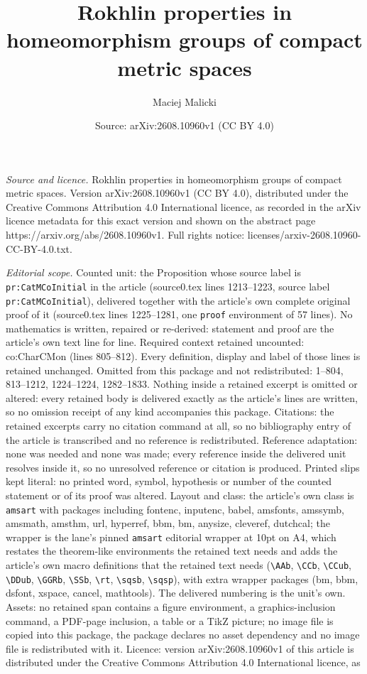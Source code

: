 \documentclass[10pt,a4paper]{amsart}
\title[Rokhlin properties in homeomorphism groups of compact metric]{Rokhlin properties in homeomorphism groups of compact metric spaces}
\author{Maciej Malicki}
\date{Source: arXiv:2608.10960v1 (CC BY 4.0)}
\begin{document}
\maketitle

\noindent\emph{Source and licence.} Rokhlin properties in homeomorphism groups of compact metric spaces. Version arXiv:2608.10960v1 (CC BY 4.0), distributed under the Creative Commons Attribution 4.0 International licence, as recorded in the arXiv licence metadata for this exact version and shown on the abstract page https://arxiv.org/abs/2608.10960v1. Full rights notice: licenses/arxiv-2608.10960-CC-BY-4.0.txt.\par\smallskip

\noindent\textit{Editorial scope.} Counted unit: the Proposition whose source label is \texttt{pr:CatMCoInitial} in the article (source0.tex lines 1213--1223, source label \texttt{pr:CatMCoInitial}), delivered together with the article's own complete original proof of it (source0.tex lines 1225--1281, one \texttt{proof} environment of 57 lines). No mathematics is written, repaired or re-derived: statement and proof are the article's own text line for line. Required context retained uncounted: co:CharCMon (lines 805--812). Every definition, display and label of those lines is retained unchanged. Omitted from this package and not redistributed: 1--804, 813--1212, 1224--1224, 1282--1833. Nothing inside a retained excerpt is omitted or altered: every retained body is delivered exactly as the article's lines are written, so no omission receipt of any kind accompanies this package. Citations: the retained excerpts carry no citation command at all, so no bibliography entry of the article is transcribed and no reference is redistributed. Reference adaptation: none was needed and none was made; every reference inside the delivered unit resolves inside it, so no unresolved reference or citation is produced. Printed slips kept literal: no printed word, symbol, hypothesis or number of the counted statement or of its proof was altered. Layout and class: the article's own class is \texttt{amsart} with packages including fontenc, inputenc, babel, amsfonts, amssymb, amsmath, amsthm, url, hyperref, bbm, bm, anysize, cleveref, dutchcal; the wrapper is the lane's pinned \texttt{amsart} editorial wrapper at 10pt on A4, which restates the theorem-like environments the retained text needs and adds the article's own macro definitions that the retained text needs (\texttt{\textbackslash AAb}, \texttt{\textbackslash CCb}, \texttt{\textbackslash CCub}, \texttt{\textbackslash DDub}, \texttt{\textbackslash GGRb}, \texttt{\textbackslash SSb}, \texttt{\textbackslash rt}, \texttt{\textbackslash sqsb}, \texttt{\textbackslash sqsp}), with extra wrapper packages (bm, bbm, dsfont, xspace, cancel, mathtools). The delivered numbering is the unit's own. Assets: no retained span contains a figure environment, a graphics-inclusion command, a PDF-page inclusion, a table or a TikZ picture; no image file is copied into this package, the package declares no asset dependency and no image file is redistributed with it. Licence: version arXiv:2608.10960v1 of this article is distributed under the Creative Commons Attribution 4.0 International licence, as 
\end{document}
